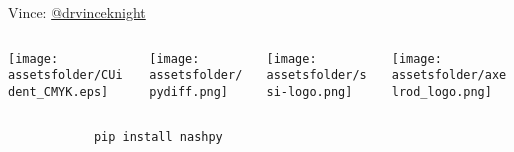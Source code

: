 \documentclass{beamer}
\newcommand{\assetsfolder}{./assets}
\begin{document}
    \begin{frame}
        \begin{center}
            \Large
               Vince: \href{https://twitter.com/drvinceknight}{@drvinceknight}\\
               \vfill
               \begin{columns}
                   \begin{column}{.25\textwidth}
                       \begin{center}
                       \texttt{[image: \\assetsfolder/CUident\_CMYK.eps]}
                       \end{center}
                   \end{column}
                   \begin{column}{.25\textwidth}
                       \begin{center}
                           \texttt{[image: \\assetsfolder/pydiff.png]}
                       \end{center}
                   \end{column}
                   \begin{column}{.25\textwidth}
                       \begin{center}
                       \texttt{[image: \\assetsfolder/ssi-logo.png]}
                       \end{center}
                   \end{column}
                   \begin{column}{.25\textwidth}
                       \begin{center}
                       \texttt{[image: \\assetsfolder/axelrod\_logo.png]}
                       \end{center}
                   \end{column}
               \end{columns}
        \end{center}

    \end{frame}

    \begin{frame}
        
    \end{frame}

    \begin{frame}[fragile]{}
            \begin{verbatim}
            pip install nashpy
            \end{verbatim}
\end{frame}
\end{document}
